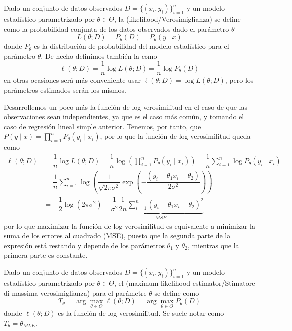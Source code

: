 \begin{definicion}
    Dado un conjunto de datos observados $D = \{(x_i, y_i)\}_{i=1}^{n}$ y un modelo estadístico parametrizado por $\theta \in \Theta$, la  (likelihood/Verosimiglianza) se define como la probabilidad conjunta de los datos observados dado el parámetro $\theta$
    \begin{equation*}
        L(\theta; D) = P_{\theta}(D) = P_{\theta}\left( y\mid x \right)
    \end{equation*}
    donde $P_{\theta}$ es la distribución de probabilidad del modelo estadístico para el parámetro $\theta$. De hecho definimos también la  como
    \begin{equation*}
        \ell(\theta; D) = \dfrac{1}{n}\log L(\theta; D) = \dfrac{1}{n}\log P_{\theta}(D)
    \end{equation*}
    en otras ocasiones será más conveniente usar $\ell(\theta; D) =\log L(\theta; D) $, pero los parámetros estimados serán los mismos.
\end{definicion}

\noindent
Desarrollemos un poco más la función de log-verosimilitud en el caso de que las observaciones sean independientes, ya que es el caso más común, y tomando el caso de regresión lineal simple anterior. Tenemos, por tanto, que $P(y\mid x) = \prod\limits_{i=1}^{n} P_{\theta}(y_i \mid x_i)$, por lo que la función de log-verosimilitud queda como
\begin{align*}
    \ell(\theta; D) &= \dfrac{1}{n} \log L(\theta; D) = \dfrac{1}{n} \log \left( \prod\limits_{i=1}^{n} P_{\theta}(y_i \mid x_i) \right) = \dfrac{1}{n} \sum\limits_{i=1}^{n} \log P_{\theta}(y_i \mid x_i)= \\
    &= \dfrac{1}{n} \sum\limits_{i=1}^{n} \log\left( \dfrac{1}{\sqrt{2\pi \sigma^2}} \exp\left( -\dfrac{(y_i - \theta_1x_i-\theta_2)}{2\sigma^2} \right) \right) = \\
    &= -\dfrac{1}{2} \log(2\pi \sigma^2) - \dfrac{1}{\sigma^2}\underbrace{\dfrac{1}{2 n} \sum\limits_{i=1}^{n} (y_i - \theta_1x_i-\theta_2)^2}_{MSE}
\end{align*}
por lo que maximizar la función de log-verosimilitud es equivalente a minimizar la suma de los errores al cuadrado (MSE), puesto que la segunda parte de la expresión está \underline{restando} y depende de los parámetros $\theta_1$ y $\theta_2$, mientras que la primera parte es constante. \\

\begin{definicion}
    Dado un conjunto de datos observados $D = \{(x_i, y_i)\}_{i=1}^{n}$ y un modelo estadístico parametrizado por $\theta \in \Theta$, el  (maximum likelihood estimator/Stimatore di massima verosimiglianza) para el parámetro $\theta$ se define como
    \begin{equation*}
        T_{\theta} = \arg \max_{\theta \in \Theta} \ell(\theta; D) = \arg \max_{\theta \in \Theta} P_{\theta}(D)
    \end{equation*}
    donde $\ell(\theta; D)$ es la función de log-verosimilitud. Se suele notar como $T_{\theta} = \theta_{MLE}$.
\end{definicion}

